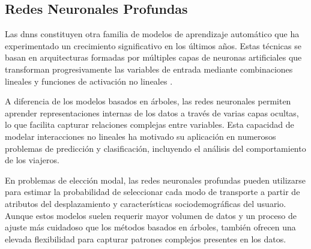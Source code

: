 \subsection{Redes Neuronales Profundas}

Las \glspl{dnn} constituyen otra familia de modelos de aprendizaje automático que ha experimentado un crecimiento significativo en los últimos años. Estas técnicas se basan en arquitecturas formadas por múltiples capas de neuronas artificiales que transforman progresivamente las variables de entrada mediante combinaciones lineales y funciones de activación no lineales \cite{Goodfellow2016}.\newline

A diferencia de los modelos basados en árboles, las redes neuronales permiten aprender representaciones internas de los datos a través de varias capas ocultas, lo que facilita capturar relaciones complejas entre variables. Esta capacidad de modelar interacciones no lineales ha motivado su aplicación en numerosos problemas de predicción y clasificación, incluyendo el análisis del comportamiento de los viajeros.\newline

En problemas de elección modal, las redes neuronales profundas pueden utilizarse para estimar la probabilidad de seleccionar cada modo de transporte a partir de atributos del desplazamiento y características sociodemográficas del usuario. Aunque estos modelos suelen requerir mayor volumen de datos y un proceso de ajuste más cuidadoso que los métodos basados en árboles, también ofrecen una elevada flexibilidad para capturar patrones complejos presentes en los datos.\newline

